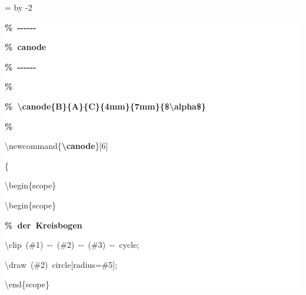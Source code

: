 \begingroup
\ttfamily
{}
=\textwidth
\advance{} by -2\fboxsep
\noindent
\colorbox{background}
{%
\parbox{\dimen255}
{%
\rule[-0.5ex]{0pt}{2.5ex}\hspace*{0.0em}\textcolor{G}{\textbf{\%~{-}{-}{-}{-}{-}{-}}}\\
\rule[-0.5ex]{0pt}{2.5ex}\hspace*{0.0em}\textcolor{G}{\textbf{\%~canode}}\\
\rule[-0.5ex]{0pt}{2.5ex}\hspace*{0.0em}\textcolor{G}{\textbf{\%~{-}{-}{-}{-}{-}{-}}}\\
\rule[-0.5ex]{0pt}{2.5ex}\hspace*{0.0em}\textcolor{G}{\textbf{\%}}\\
\rule[-0.5ex]{0pt}{2.5ex}\hspace*{0.0em}\textcolor{G}{\textbf{\%~\textbackslash{}canode\{B\}\{A\}\{C\}\{4mm\}\{7mm\}\{\$\textbackslash{}alpha\$\}}}\\
\rule[-0.5ex]{0pt}{2.5ex}\hspace*{0.0em}\textcolor{G}{\textbf{\%}}\\
\rule[-0.5ex]{0pt}{2.5ex}\hspace*{0.0em}\textbackslash{}newcommand\{\textcolor{R}{\textbf{\textbackslash{}canode}}\}[6]\\
\rule[-0.5ex]{0pt}{2.5ex}\hspace*{0.0em}\{\\
\rule[-0.5ex]{0pt}{2.5ex}\hspace*{1.0em}\textbackslash{}begin\{scope\}\\
\rule[-0.5ex]{0pt}{2.5ex}\hspace*{2.0em}\textbackslash{}begin\{scope\}\\
\rule[-0.5ex]{0pt}{2.5ex}\hspace*{3.0em}\textcolor{G}{\textbf{\%~der~Kreisbogen}}\\
\rule[-0.5ex]{0pt}{2.5ex}\hspace*{3.0em}\textbackslash{}clip~(\#1)~{-}{-}~(\#2)~{-}{-}~(\#3)~{-}{-}~cycle;\\
\rule[-0.5ex]{0pt}{2.5ex}\hspace*{3.0em}\textbackslash{}draw~(\#2)~circle[radius=\#5];\\
\rule[-0.5ex]{0pt}{2.5ex}\hspace*{2.0em}\textbackslash{}end\{scope\}\\
}}
